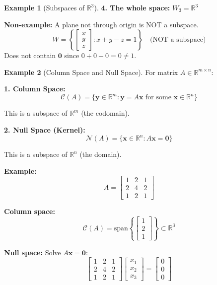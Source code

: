 \documentclass[12pt,a4paper]{article}
\theoremstyle{definition}
\newtheorem{example}{Example}[section]
\begin{document}
\begin{example}[Subspaces of $\mathbb{R}^3$]
\textbf{4. The whole space:} $W_3 = \mathbb{R}^3$

\textbf{Non-example:} A plane not through origin is NOT a subspace.
\begin{equation}
W = \left\{\begin{bmatrix} x \\ y \\ z \end{bmatrix} : x + y - z = 1\right\} \quad \text{(NOT a subspace)}
\end{equation}
Does not contain $\mathbf{0}$ since $0 + 0 - 0 = 0 \neq 1$.
\end{example}

\begin{example}[Column Space and Null Space]
For matrix $A \in \mathbb{R}^{m \times n}$:

\textbf{1. Column Space:}
\begin{equation}
\mathcal{C}(A) = \{\mathbf{y} \in \mathbb{R}^m : \mathbf{y} = A\mathbf{x} \text{ for some } \mathbf{x} \in \mathbb{R}^n\}
\end{equation}

This is a subspace of $\mathbb{R}^m$ (the codomain).

\textbf{2. Null Space (Kernel):}
\begin{equation}
\mathcal{N}(A) = \{\mathbf{x} \in \mathbb{R}^n : A\mathbf{x} = \mathbf{0}\}
\end{equation}

This is a subspace of $\mathbb{R}^n$ (the domain).

\textbf{Example:}
\begin{equation}
A = \begin{bmatrix} 1 & 2 & 1 \\ 2 & 4 & 2 \\ 1 & 2 & 1 \end{bmatrix}
\end{equation}

\textbf{Column space:}
\begin{equation}
\mathcal{C}(A) = \text{span}\left\{\begin{bmatrix} 1 \\ 2 \\ 1 \end{bmatrix}\right\} \subset \mathbb{R}^3
\end{equation}

\textbf{Null space:} Solve $A\mathbf{x} = \mathbf{0}$:
\begin{equation}
\begin{bmatrix} 1 & 2 & 1 \\ 2 & 4 & 2 \\ 1 & 2 & 1 \end{bmatrix} \begin{bmatrix} x_1 \\ x_2 \\ x_3 \end{bmatrix} = \begin{bmatrix} 0 \\ 0 \\ 0 \end{bmatrix}
\end{equation}


\end{example}
\end{document}
